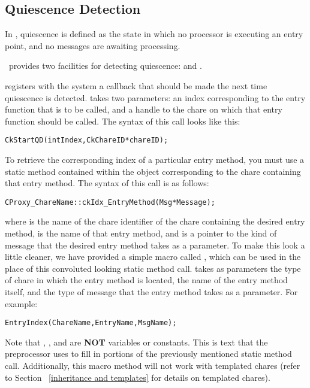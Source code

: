 \subsection{Quiescence Detection}

In \charmpp, quiescence is defined as the state in which no
processor is executing an entry point, and no messages are awaiting processing.

\charmpp\ provides two facilities for detecting quiescence:  and
.

 registers with the system a callback that should be made the
next time quiescence is detected.   takes two
parameters: an index corresponding to the entry function that is to be called,
and a handle to the chare on which that entry function should be called.  The
syntax of this call looks like this:

\begin{alltt}
 CkStartQD(int Index, CkChareID* chareID);
\end{alltt}

To retrieve the corresponding index of a particular entry
method, you must use a static method contained within the  object
corresponding to the chare containing that entry method.  The
syntax of this call is as follows:

\begin{alltt}
CProxy_ChareName::ckIdx_EntryMethod(Msg *Message);
\end{alltt}

where  is the name of the chare identifier of the chare containing
the desired entry method,  is the name of that entry method,
and  is a pointer to the kind of message that the desired entry
method takes as a parameter. To make this look a little cleaner, we have
provided a simple macro called , which can be used in the place
of this convoluted looking static method call.   takes as
parameters the type of chare in which the entry method is located, the name of
the entry method itself, and the type of message that the entry method takes as
a parameter. For example:

\begin{alltt}
 EntryIndex(ChareName, EntryName, MsgName);
\end{alltt}

Note that , , and  are {\bf NOT}
variables or constants. This is text that the preprocessor uses to fill in
portions of the previously mentioned static method call.  Additionally, this
macro method will not work with templated chares (refer to Section
~\ref{inheritance and templates} for details on templated chares).

